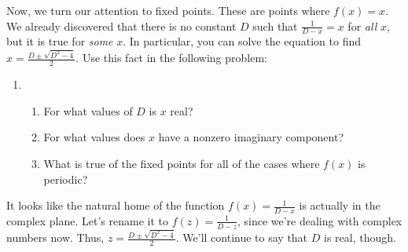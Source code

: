 \documentclass[../gatm.tex]{subfiles}
\begin{document}
\noindent Now, we turn our attention to fixed points. These are points where $f(x)=x$. We already discovered that there is no constant $D$ such that $\frac{1}{D-x}=x$ for \textit{all} $x$, but it is true for \textit{some} $x$. In particular, you can solve the equation to find $x=\frac{D\pm \sqrt{D^2-4}}{2}$. Use this fact in the following problem:

\begin{enumerate}
\setcounter{enumi}{\value{problem_i}}
\item \begin{enumerate}
\item For what values of $D$ is $x$ real?
\item For what values does $x$ have a nonzero imaginary component?
\item What is true of the fixed points for all of the cases where $f(x)$ is periodic?
\end{enumerate}
\setcounter{problem_i}{\value{enumi}}
\end{enumerate}

\noindent It looks like the natural home of the function $f(x)=\frac{1}{D-x}$ is actually in the complex plane. Let's rename it to $f(z)=\frac{1}{D-z}$, since we're dealing with complex numbers now. Thus, $z=\frac{D\pm \sqrt{D^2-4}}{2}$. We'll continue to say that $D$ is real, though.
\end{document}
